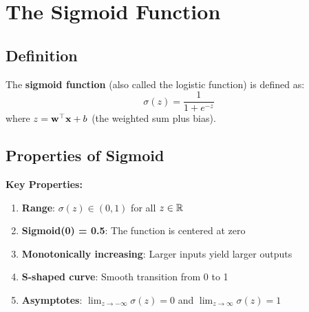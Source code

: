 
\section{The Sigmoid Function}

\subsection{Definition}

\begin{definitionbox}
The \textbf{sigmoid function} (also called the logistic function) is defined as:
\[
\sigma(z) = \frac{1}{1 + e^{-z}}
\]
where $z = \mathbf{w}^\top \mathbf{x} + b$ (the weighted sum plus bias).
\end{definitionbox}

\subsection{Properties of Sigmoid}

\begin{center}
\end{center}

\textbf{Key Properties:}

\begin{enumerate}
    \item \textbf{Range}: $\sigma(z) \in (0, 1)$ for all $z \in \mathbb{R}$
    \item \textbf{Sigmoid(0) = 0.5}: The function is centered at zero
    \item \textbf{Monotonically increasing}: Larger inputs yield larger outputs
    \item \textbf{S-shaped curve}: Smooth transition from 0 to 1
    \item \textbf{Asymptotes}: $\lim_{z \to -\infty} \sigma(z) = 0$ and $\lim_{z \to \infty} \sigma(z) = 1$
\end{enumerate}

